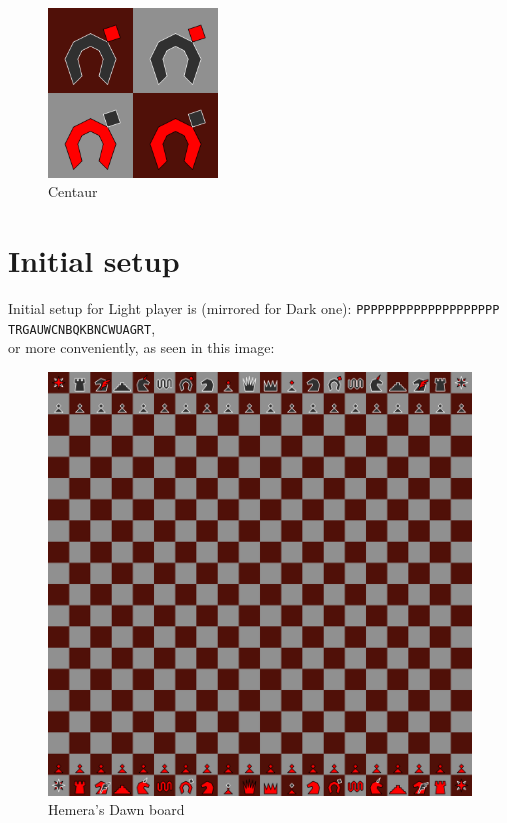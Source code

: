\documentclass[a5paper,12pt,draft]{book} %
\begin{document}
\noindent
\begin{figure}
\includegraphics[width=0.4\textwidth, keepaspectratio=true]{../gfx/pieces/12_centaur.png}
\caption{Centaur}
\label{fig:centaur}
\end{figure}

\clearpage

\section*{Initial setup}

Initial setup for Light player is (mirrored for Dark one):
\texttt{PPPPPPPPPPPPPPPPPPPP \\
        TRGAUWCNBQKBNCWUAGRT}, \\
or more conveniently, as seen in this image:

\noindent
\begin{figure}[h]
\includegraphics[width=1.0\textwidth, keepaspectratio=true]{../gfx/boards/14_hemera_s_dawn.png}
\caption{Hemera's Dawn board}
\label{fig:hemera_s_dawn}
\end{figure}
\end{document}

